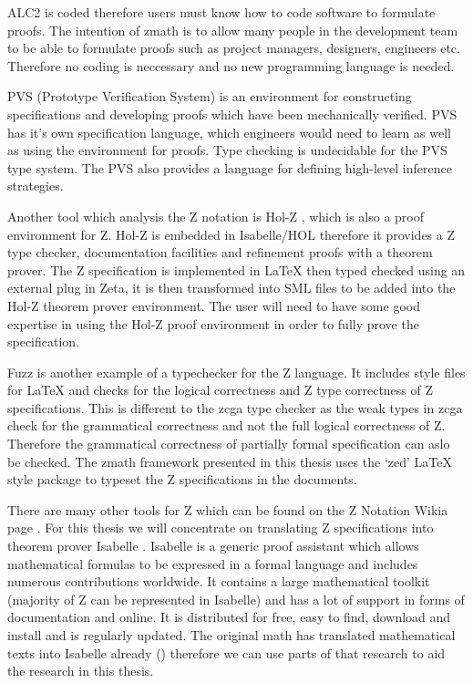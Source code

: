 ALC2 is coded therefore users must know how to code software to formulate proofs. The intention of \gls{zmath} is to allow many people in the development team to be able to formulate proofs such as project managers, designers, engineers etc. Therefore no coding is neccessary and no new programming language is needed.

PVS (Prototype Verification System) \cite{pvs} is an environment for constructing specifications and developing proofs which have been mechanically verified. PVS has it's own specification language, which engineers would need to learn as well as using the environment for proofs. Type checking is undecidable for the PVS type system. The PVS also provides a language for defining high-level inference strategies.

Another tool which analysis the Z notation is Hol-Z \cite{hol-z}, which is also a proof environment for Z. Hol-Z is embedded in Isabelle/HOL therefore it provides a Z type checker, documentation facilities and refinement proofs with a theorem prover. The Z specification is implemented in \LaTeX{} then typed checked using an external plug in Zeta, it is then transformed into SML files to be added into the Hol-Z theorem prover environment. The user will need to have some good expertise in using the Hol-Z proof environment in order to fully prove the specification.

Fuzz \cite{spiveyfuzz} is another example of a typechecker for the Z language. It includes style files for \LaTeX{} and checks for the logical correctness and Z type correctness of Z specifications. This is different to the \gls{zcga} type checker as the weak types in \gls{zcga} check for the grammatical correctness and not the full logical correctness of Z. Therefore the grammatical correctness of partially formal specification can aslo be checked. The \gls{zmath} framework presented in this thesis uses the `zed' \LaTeX{} style package to typeset the Z specifications in the documents.

There are many other tools for Z which can be found on the Z Notation Wikia page \cite{zwikia}. For this thesis we will concentrate on translating Z specifications into theorem prover Isabelle \cite{isabelle}. Isabelle is a generic proof assistant which allows mathematical formulas to be expressed in a formal language and includes numerous contributions worldwide. It contains a large mathematical toolkit (majority of Z can be represented in Isabelle) and has a lot of support in forms of documentation and online. It is distributed for free, easy to find, download and install and is regularly updated. The original \gls{math} has translated mathematical texts into Isabelle already (\cite{mathintoisa}) therefore we can use parts of that research to aid the research in this thesis.

